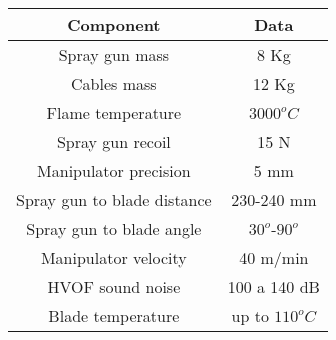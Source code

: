 \begin{center}
\begin{tabular}{  c | c  }
  \hline
  \textbf{Component} & \textbf{Data} \\ \hline
  Spray gun mass & 8 Kg  \\ \hline
  Cables mass & 12 Kg  \\ \hline
  Flame temperature & $3000^oC$ \\ \hline
  Spray gun recoil & 15 N \\ \hline
  Manipulator precision & 5 mm \\ \hline
  Spray gun to blade distance & 230-240 mm \\ \hline
  Spray gun to blade angle & $30^o$-$90^o$ \\ \hline
  Manipulator velocity & 40 m/min \\ \hline
  HVOF sound noise & 100 a 140 dB \\ \hline
  Blade temperature & up to $110^oC$ \\
  \hline
\end{tabular}
\label{tab::hvof}
\end{center}




